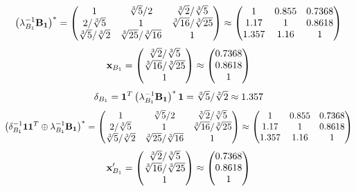 \documentclass[10pt,a4paper]{article}
\begin{document}
	\[
		\left(\lambda_{B_1}^{-1}\bold{B_1}\right)^* = 
		\begin{pmatrix}
			{1}{} & {\sqrt[3]{5}} / {{2}} & {\sqrt[3]{2}} / {\sqrt[3]{5}} \\
			{{2}} / {\sqrt[3]{5}} & {1}{} & {\sqrt[3]{16}} / {\sqrt[3]{25}} \\
			{\sqrt[3]{5}} / {\sqrt[3]{2}} & {\sqrt[3]{25}} / {\sqrt[3]{16}} & {1}{} \\
		\end{pmatrix}
		\approx
		\begin{pmatrix}
			1        & 0.855    & 0.7368   \\
			1.17     & 1        & 0.8618   \\
			1.357    & 1.16     & 1        \\
		\end{pmatrix}
	\]
	\[
		\bold{x}_{B_1} = 
		\begin{pmatrix}
			{\sqrt[3]{2}} / {\sqrt[3]{5}} \\
			{\sqrt[3]{16}} / {\sqrt[3]{25}} \\
			{1}{} \\
		\end{pmatrix}
		\approx
		\begin{pmatrix}
			0.7368   \\
			0.8618   \\
			1        \\
		\end{pmatrix}
	\]
	\[
		\delta_{B_1} = \bold{1}^T \left(\lambda_{B_1}^{-1}\bold{B_1}\right)^* \bold{1} = {\sqrt[3]{5}} / {\sqrt[3]{2}}\approx 1.357
	\]
	\[
		\left(\delta_{B_1}^{-1}\bold{11}^T \oplus \lambda_{B_1}^{-1}\bold{B_1}\right)^* = 
		\begin{pmatrix}
			{1}{} & {\sqrt[3]{5}} / {{2}} & {\sqrt[3]{2}} / {\sqrt[3]{5}} \\
			{{2}} / {\sqrt[3]{5}} & {1}{} & {\sqrt[3]{16}} / {\sqrt[3]{25}} \\
			{\sqrt[3]{5}} / {\sqrt[3]{2}} & {\sqrt[3]{25}} / {\sqrt[3]{16}} & {1}{} \\
		\end{pmatrix}
		\approx
		\begin{pmatrix}
			1        & 0.855    & 0.7368   \\
			1.17     & 1        & 0.8618   \\
			1.357    & 1.16     & 1        \\
		\end{pmatrix}
	\]
	\[
		\bold{x}'_{B_1} = 
		\begin{pmatrix}
			{\sqrt[3]{2}} / {\sqrt[3]{5}} \\
			{\sqrt[3]{16}} / {\sqrt[3]{25}} \\
			{1}{} \\
		\end{pmatrix}
		\approx
		\begin{pmatrix}
			0.7368   \\
			0.8618   \\
			1        \\
		\end{pmatrix}
	\]
\end{document}
